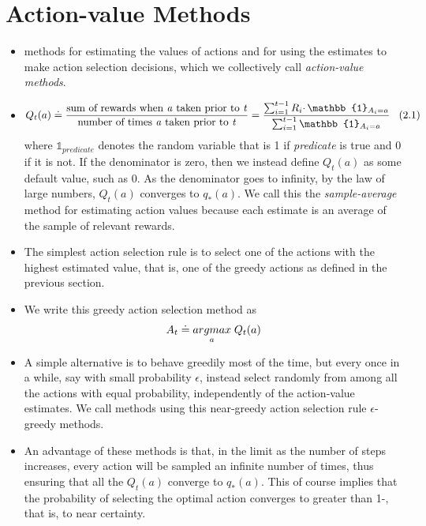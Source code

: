 \documentclass{article}
\begin{document}
\section{Action-value Methods}
\begin{itemize}
    \item methods for estimating the values of actions and for using the estimates to make action selection decisions, 
    which we collectively call \emph{action-value methods}.
    \item $$ Q_t(a) \doteq \frac{\text{sum of rewards when \emph{a} taken prior to \emph{t}}}{\text{number of times \emph{a} taken prior to \emph{t}}} = \frac{\sum_{i=1}^{t-1} R_i \cdotp \mathbb{1}_{A_i=a}}{\sum_{i=1}^{t-1}\mathbb{1}_{A_i=a}} \thickspace \thickspace \thickspace \text{(2.1)} $$
    where $ \mathbb{1}_{predicate} $ denotes the random variable that is 1 if \emph{predicate} is true and 0 if it is not.
    If the denominator is zero, then we instead define $ Q_t(a) $ as some default value, such as
    0. As the denominator goes to infinity, by the law of large numbers, $ Q_t(a) $ converges to
    $ q_*(a) $. We call this the \emph{sample-average} method for estimating action values because each
    estimate is an average of the sample of relevant rewards.
    \item The simplest action selection rule is to select one of the actions with the highest
    estimated value, that is, one of the greedy actions as defined in the previous section.
    \item We write this greedy action selection method as
    $$ A_t \doteq \underset{a}{argmax} \thickspace Q_t(a) $$
    \item A simple alternative is to behave greedily most of the time, but every once in a while, 
    say with small probability $ \epsilon $, instead select randomly from among all the actions with equal 
    probability, independently of the action-value estimates. We call methods using this near-greedy action selection rule
    $ \epsilon $-greedy methods.
    \item An advantage of these methods is that, in the limit as the number of
    steps increases, every action will be sampled an infinite number of times, thus ensuring
    that all the $ Q_t(a) $ converge to $ q_*(a) $. This of course implies that the probability of selecting
    the optimal action converges to greater than 1-\textepsilon, that is, to near certainty.
\end{itemize}
\end{document}
